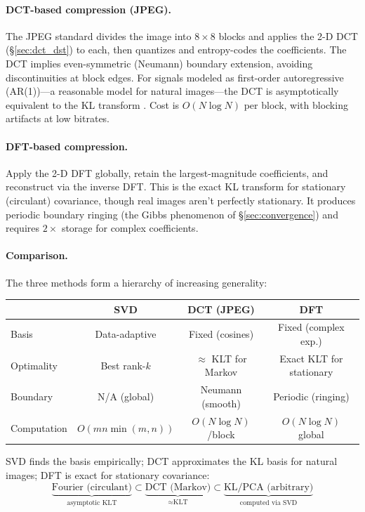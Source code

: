 \documentclass[12pt,a4paper]{report}
\theoremstyle{thms}
\theoremstyle{defns}
\begin{document}
\paragraph{DCT-based compression (JPEG).} The JPEG standard divides the image into $8 \times 8$ blocks and applies the 2-D DCT (\S\ref{sec:dct_dst}) to each, then quantizes and entropy-codes the coefficients. The DCT implies even-symmetric (Neumann) boundary extension, avoiding discontinuities at block edges. For signals modeled as first-order autoregressive (AR(1))—a reasonable model for natural images—the DCT is asymptotically equivalent to the KL transform \cite{strang_learning}. Cost is $O(N \log N)$ per block, with blocking artifacts at low bitrates.

\paragraph{DFT-based compression.} Apply the 2-D DFT globally, retain the largest-magnitude coefficients, and reconstruct via the inverse DFT. This is the exact KL transform for stationary (circulant) covariance, though real images aren't perfectly stationary. It produces periodic boundary ringing (the Gibbs phenomenon of \S\ref{sec:convergence}) and requires $2\times$ storage for complex coefficients.

\paragraph{Comparison.} The three methods form a hierarchy of increasing generality:

\begin{center}
    \begin{tabular}{l c c c}
        \hline
        & \textbf{SVD} & \textbf{DCT (JPEG)} & \textbf{DFT} \\
        \hline
        Basis & Data-adaptive & Fixed (cosines) & Fixed (complex exp.) \\
        Optimality & Best rank-$k$ & $\approx$ KLT for Markov & Exact KLT for stationary \\
        Boundary & N/A (global) & Neumann (smooth) & Periodic (ringing) \\
        Computation & $O(mn\min(m,n))$ & $O(N\log N)$/block & $O(N\log N)$ global \\
        \hline
    \end{tabular}
\end{center}

\noindent SVD finds the basis empirically; DCT approximates the KL basis for natural images; DFT is exact for stationary covariance:
\begin{equation}
    \underbrace{\text{Fourier (circulant)}}_{\text{asymptotic KLT}} \subset \underbrace{\text{DCT (Markov)}}_{\approx \text{KLT}} \subset \underbrace{\text{KL/PCA (arbitrary)}}_{\text{computed via SVD}}
\end{equation}
\end{document}
